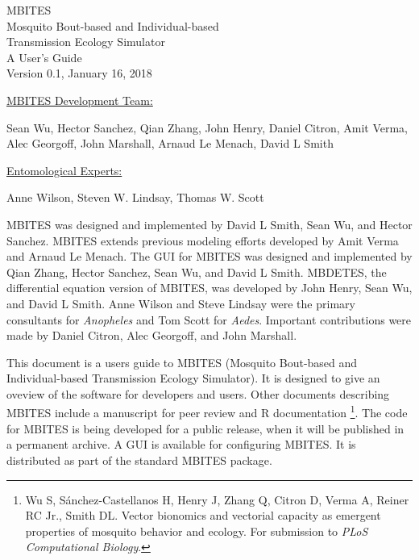 \documentclass{article}
\begin{document}
\begin{centering}
\Huge{MBITES}\\
\large{Mosquito Bout-based and Individual-based \\ Transmission Ecology Simulator}\\
\vspace{0.2in}
\huge{A User's Guide} \\
\large{Version 0.1, January 16, 2018} \\
\vspace{0.3in} 
\large{\underline {MBITES Development Team:}

\vspace{0.1in} 

Sean Wu, Hector Sanchez, Qian Zhang, John Henry, Daniel Citron, Amit Verma, Alec Georgoff, John Marshall, Arnaud Le Menach, David L Smith\\}

\vspace{0.2in} 

\large{\underline {Entomological Experts:}

\vspace{0.1in} 

Anne Wilson, Steven W. Lindsay, Thomas W. Scott\\}

\end{centering}




\vspace{0.3in}

MBITES was designed and implemented by David L Smith, Sean Wu, and Hector Sanchez. MBITES extends previous modeling efforts developed by Amit Verma and Arnaud Le Menach. The GUI for MBITES was designed and implemented by Qian Zhang, Hector Sanchez, Sean Wu, and David L Smith. MBDETES, the differential equation version of MBITES, was developed by John Henry, Sean Wu, and David L Smith. Anne Wilson and Steve Lindsay were the primary consultants for {\em Anopheles} and Tom Scott for {\em Aedes}. Important contributions were made by Daniel Citron, Alec Georgoff, and John Marshall. 

This document is a users guide to MBITES (Mosquito Bout-based and Individual-based Transmission Ecology Simulator). It is designed to give an oveview of the software for developers and users. Other documents describing MBITES include a manuscript for peer review and R documentation \footnote{Wu S, S{\' a}nchez-Castellanos H, Henry J, Zhang Q, Citron D, Verma A, Reiner RC Jr., Smith DL. Vector bionomics and vectorial capacity as emergent properties of mosquito behavior and ecology. For submission to {\em PLoS Computational Biology}.}. The code for MBITES is being developed for a public release, when it will be published in a permanent archive. A GUI is available for configuring MBITES. It is distributed as part of the standard MBITES package. 
\end{document}
